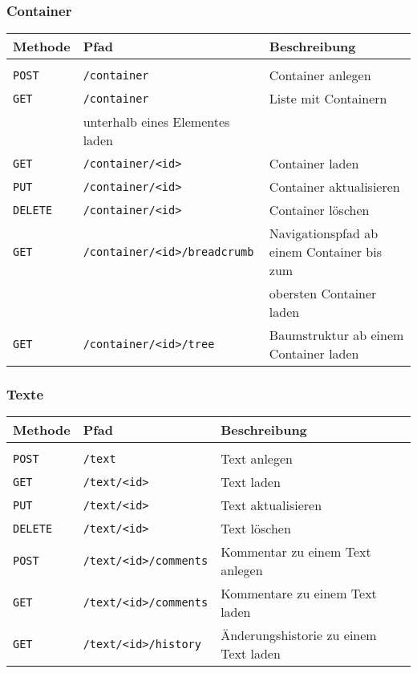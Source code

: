 \subsubsection{Container}

\begin{tabular}{@{}l l l}
\textbf{Methode} & \textbf{Pfad} & \textbf{Beschreibung}\\
\hline\\[-1.5ex]
\texttt{POST} & \texttt{/container}& Container anlegen\\
\texttt{GET} & \texttt{/container} & Liste mit Containern\\
& unterhalb eines Elementes laden\\
\texttt{GET} & \texttt{/container/<id>} & Container laden\\
\texttt{PUT} & \texttt{/container/<id>} & Container aktualisieren\\
\texttt{DELETE} & \texttt{/container/<id>} & Container löschen\\
\texttt{GET} & \texttt{/container/<id>/breadcrumb} & Navigationspfad ab einem Container bis zum\\
&&obersten Container laden\\
\texttt{GET} & \texttt{/container/<id>/tree} & Baumstruktur ab einem Container laden\\
\end{tabular}

\subsubsection{Texte}

\begin{tabular}{@{}l l l}
\textbf{Methode} & \textbf{Pfad} & \textbf{Beschreibung}\\
\hline\\[-1.5ex]
\texttt{POST} & \texttt{/text} & Text anlegen\\
\texttt{GET} & \texttt{/text/<id>} & Text laden\\
\texttt{PUT} & \texttt{/text/<id>} & Text aktualisieren\\
\texttt{DELETE} & \texttt{/text/<id>} & Text löschen\\
\texttt{POST} & \texttt{/text/<id>/comments} & Kommentar zu einem Text anlegen\\
\texttt{GET} & \texttt{/text/<id>/comments} & Kommentare zu einem Text laden\\
\texttt{GET} & \texttt{/text/<id>/history} & Änderungshistorie zu einem Text laden\\
\end{tabular}

